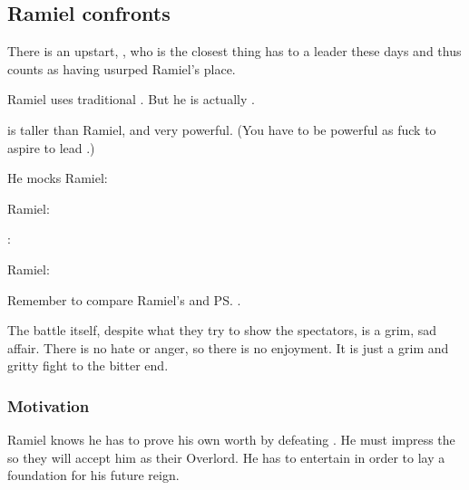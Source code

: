 \subsection{Ramiel confronts \Dasteron}
There is an upstart, , who is the closest thing \Mystraacht{} has to a leader these days and thus counts as having usurped Ramiel's place. 

Ramiel uses traditional \Mystraacht {}. 
But he is actually . 

\Dasteron{} is taller than Ramiel, and very powerful. 
(You have to be powerful as fuck to aspire to lead \Mystraacht.)

He mocks Ramiel: 

Ramiel:

\Dasteron{}: 

Ramiel: 

Remember to compare Ramiel's and \ps{\Dasteron} . 

The battle itself, despite what they try to show the spectators, is a grim, sad affair.
There is no hate or anger, so there is no enjoyment.
It is just a grim and gritty fight to the bitter end.





\subsubsection{Motivation}
Ramiel knows he has to prove his own worth by defeating \Dasteron. 
He must impress the \Mystraacht{} so they will accept him as their Overlord. 
He has to entertain in order to lay a foundation for his future reign. 

